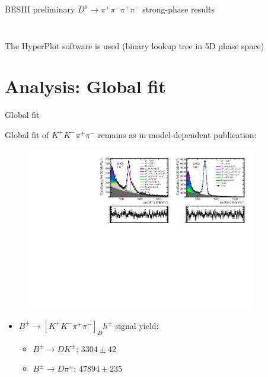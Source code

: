 \documentclass[xcolor={dvipsnames}]{beamer}
\begin{document}
\begin{frame}{BESIII preliminary $D^0\to\pi^+\pi^-\pi^+\pi^-$ strong-phase results}
\begin{columns}
\begin{column}{0.50\textwidth}
\begin{figure}
      \end{figure}
    \end{column}
  \end{columns}
  \begin{center}
    The HyperPlot software is used (binary lookup tree in 5D phase space)
  \end{center}
\end{frame}

\section{Analysis: Global fit}
\begin{frame}{Global fit}
  \begin{center}
    {\large Global fit of $K^+K^-\pi^+\pi^-$ remains as in model-dependent publication:}
  \end{center}
  \vspace{-0.5cm}
  \begin{figure}
    \centering
    \includegraphics[width = 0.9\textwidth,trim={0 0 0 0},clip=true]{Plots/d2kkpipi_fiveL_allDP.pdf}
  \end{figure}
  \vspace{-0.5cm}
  \begin{itemize}
    \item{$B^\pm\to[K^+K^-\pi^+\pi^-]_Dh^\pm$ signal yield:}
    \begin{itemize}
      \item{$B^\pm\to DK^\pm$: $3304 \pm 42$}
      \item{$B^\pm\to D\pi^\pm$: $47894 \pm 235$}
    \end{itemize}
  \end{itemize}
\end{frame}
\end{document}
